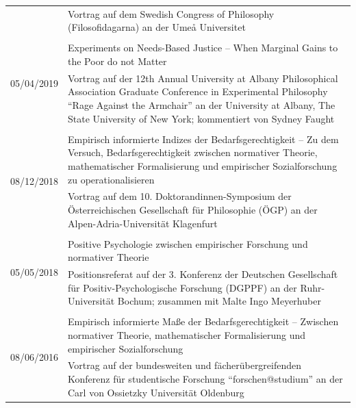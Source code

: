 \documentclass[a4paper,10pt]{article}
\begin{document}
\begin{longtable}{p{2.5cm}p{11cm}}
& \footnotesize{Vortrag auf dem Swedish Congress of Philosophy (Filosofidagarna) an der Umeå Universitet}\\
\\
\multirow{2}{2.5cm}{\footnotesize{05/04/2019}} & Experiments on Needs-Based Justice -- When Marginal Gains to the Poor do not Matter\\
& \footnotesize{Vortrag auf der 12th Annual University at Albany Philosophical Association Graduate Conference in Experimental Philosophy \enquote{Rage Against the Armchair} an der University at Albany, The State University of New York; kommentiert von Sydney Faught}\\
\\
\multirow{2}{2.5cm}{\footnotesize{08/12/2018}} & Empirisch informierte Indizes der Bedarfsgerechtigkeit -- Zu dem Versuch, Bedarfsgerechtigkeit zwischen normativer Theorie, mathematischer Formalisierung und empirischer Sozialforschung zu operationalisieren\\
& \footnotesize{Vortrag auf dem 10. Doktorandinnen-Symposium der Österreichischen Gesellschaft für Philosophie (ÖGP) an der Alpen-Adria-Universität Klagenfurt}\\
\\
\multirow{2}{2.5cm}{\footnotesize{05/05/2018}} & Positive Psychologie zwischen empirischer Forschung und normativer Theorie\\
& \footnotesize{Positionsreferat auf der 3. Konferenz der Deutschen Gesellschaft für Positiv-Psychologische Forschung (DGPPF) an der Ruhr-Universität Bochum; zusammen mit Malte Ingo Meyerhuber}\\
\\
\multirow{2}{2.5cm}{\footnotesize{08/06/2016}} & Empirisch informierte Maße der Bedarfsgerechtigkeit -- Zwischen normativer Theorie, mathematischer Formalisierung und empirischer Sozialforschung\\
& \footnotesize{Vortrag auf der bundesweiten und fächerübergreifenden Konferenz für studentische Forschung \enquote{forschen@studium} an der Carl von Ossietzky Universität Oldenburg}\\
\end{longtable}


\end{document}
